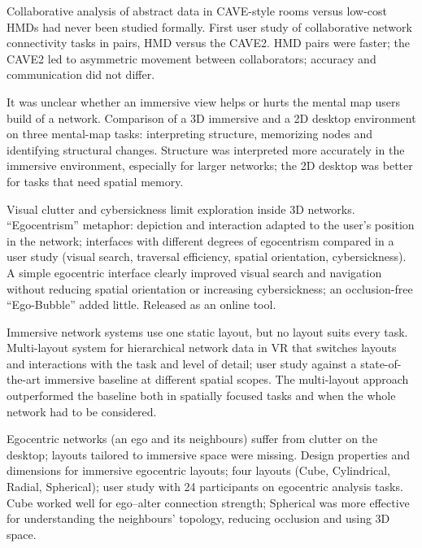 \documentclass[11pt,a4paper]{article}
\begin{document}
\prob Collaborative analysis of abstract data in CAVE-style rooms versus low-cost HMDs had
never been studied formally.
\meth First user study of collaborative network connectivity tasks in pairs, HMD versus the
CAVE2.
\res HMD pairs were faster; the CAVE2 led to asymmetric movement between collaborators;
accuracy and communication did not differ.

\prob It was unclear whether an immersive view helps or hurts the mental map users build of
a network.
\meth Comparison of a 3D immersive and a 2D desktop environment on three mental-map tasks:
interpreting structure, memorizing nodes and identifying structural changes.
\res Structure was interpreted more accurately in the immersive environment, especially
for larger networks; the 2D desktop was better for tasks that need spatial memory.

\prob Visual clutter and cybersickness limit exploration inside 3D networks.
\meth ``Egocentrism'' metaphor: depiction and interaction adapted to the user's position in
the network; interfaces with different degrees of egocentrism compared in a user study
(visual search, traversal efficiency, spatial orientation, cybersickness).
\res A simple egocentric interface clearly improved visual search and navigation without
reducing spatial orientation or increasing cybersickness; an occlusion-free ``Ego-Bubble''
added little. Released as an online tool.

\prob Immersive network systems use one static layout, but no layout suits every task.
\meth Multi-layout system for hierarchical network data in VR that switches layouts and
interactions with the task and level of detail; user study against a state-of-the-art
immersive baseline at different spatial scopes.
\res The multi-layout approach outperformed the baseline both in spatially focused tasks
and when the whole network had to be considered.

\prob Egocentric networks (an ego and its neighbours) suffer from clutter on the desktop;
layouts tailored to immersive space were missing.
\meth Design properties and dimensions for immersive egocentric layouts; four layouts
(Cube, Cylindrical, Radial, Spherical); user study with 24 participants on egocentric
analysis tasks.
\res Cube worked well for ego--alter connection strength; Spherical was more effective for
understanding the neighbours' topology, reducing occlusion and using 3D space.
\end{document}
